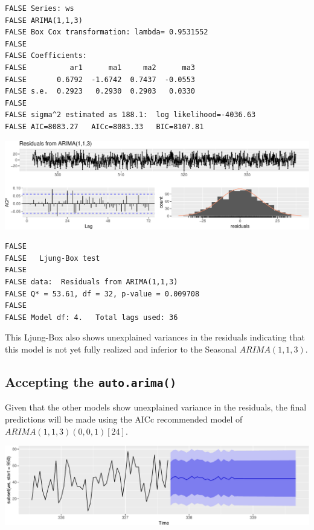 \documentclass[openany]{book}
\begin{document}
\begin{verbatim}
FALSE Series: ws 
FALSE ARIMA(1,1,3) 
FALSE Box Cox transformation: lambda= 0.9531552 
FALSE 
FALSE Coefficients:
FALSE          ar1      ma1     ma2      ma3
FALSE       0.6792  -1.6742  0.7437  -0.0553
FALSE s.e.  0.2923   0.2930  0.2903   0.0330
FALSE 
FALSE sigma^2 estimated as 188.1:  log likelihood=-4036.63
FALSE AIC=8083.27   AICc=8083.33   BIC=8107.81
\end{verbatim}

\includegraphics{Part-C-BP_files/figure-latex/unnamed-chunk-13-1.pdf}

\begin{verbatim}
FALSE 
FALSE   Ljung-Box test
FALSE 
FALSE data:  Residuals from ARIMA(1,1,3)
FALSE Q* = 53.61, df = 32, p-value = 0.009708
FALSE 
FALSE Model df: 4.   Total lags used: 36
\end{verbatim}

This Ljung-Box also shows unexplained variances in the residuals
indicating that this model is not yet fully realized and inferior to the
Seasonal \(ARIMA (1,1,3)\).

\hypertarget{accepting-the-auto.arima}{%
\subsection{\texorpdfstring{Accepting the
\texttt{auto.arima()}}{Accepting the auto.arima()}}\label{accepting-the-auto.arima}}

Given that the other models show unexplained variance in the residuals,
the final predictions will be made using the AICc recommended model of
\(ARIMA (1,1,3)(0,0,1)[24]\).

\includegraphics{Part-C-BP_files/figure-latex/unnamed-chunk-14-1.pdf}
\end{document}
